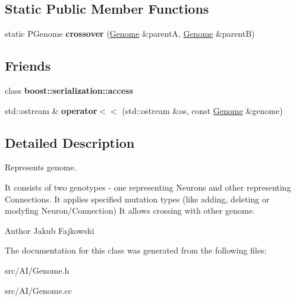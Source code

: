 \subsection*{Static Public Member Functions}
\begin{DoxyCompactItemize}
\item 
static P\+Genome {\bfseries crossover} (\hyperlink{classGenome}{Genome} \&parentA, \hyperlink{classGenome}{Genome} \&parentB)\hypertarget{classGenome_a8aa2d1d912b730c698fb457072b96c41}{}\label{classGenome_a8aa2d1d912b730c698fb457072b96c41}

\end{DoxyCompactItemize}
\subsection*{Friends}
\begin{DoxyCompactItemize}
\item 
class {\bfseries boost\+::serialization\+::access}\hypertarget{classGenome_ac98d07dd8f7b70e16ccb9a01abf56b9c}{}\label{classGenome_ac98d07dd8f7b70e16ccb9a01abf56b9c}

\item 
std\+::ostream \& {\bfseries operator$<$$<$} (std\+::ostream \&os, const \hyperlink{classGenome}{Genome} \&genome)\hypertarget{classGenome_a18f3541c63496097bd51def08c049428}{}\label{classGenome_a18f3541c63496097bd51def08c049428}

\end{DoxyCompactItemize}


\subsection{Detailed Description}
Represents genome. 

It consists of two genotypes -\/ one representing Neurons and other representing Connections. It applies specified mutation types (like adding, deleting or modyfing Neuron/\+Connection) It allows crossing with other genome. \begin{DoxyAuthor}{Author}
Jakub Fajkowski 
\end{DoxyAuthor}


The documentation for this class was generated from the following files\+:\begin{DoxyCompactItemize}
\item 
src/\+A\+I/Genome.\+h\item 
src/\+A\+I/Genome.\+cc\end{DoxyCompactItemize}
